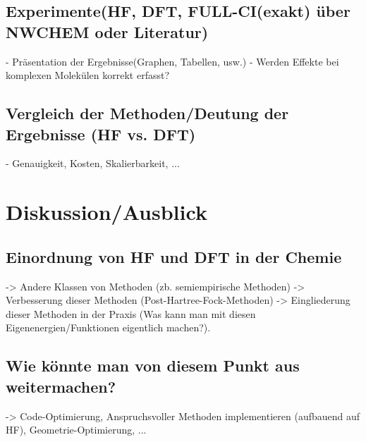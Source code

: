 \documentclass[a4paper, 12pt]{report}
\begin{document}
\section{Experimente(HF, DFT, FULL-CI(exakt) über NWCHEM oder Literatur)}
- Präsentation der Ergebnisse(Graphen, Tabellen, usw.)
- Werden Effekte bei komplexen Molekülen korrekt erfasst?

\section{Vergleich der Methoden/Deutung der Ergebnisse (HF vs. DFT)}
- Genauigkeit, Kosten, Skalierbarkeit, ...

\chapter{Diskussion/Ausblick}
\section{Einordnung von HF und DFT in der Chemie}
-> Andere Klassen von Methoden (zb. semiempirische Methoden)
-> Verbesserung dieser Methoden (Post-Hartree-Fock-Methoden)
-> Eingliederung dieser Methoden in der Praxis (Was kann man mit
diesen Eigenenergien/Funktionen eigentlich machen?).

\section{Wie könnte man von diesem Punkt aus weitermachen?}
-> Code-Optimierung, Anspruchsvoller Methoden implementieren
(aufbauend auf HF), Geometrie-Optimierung, ...



\end{document}
